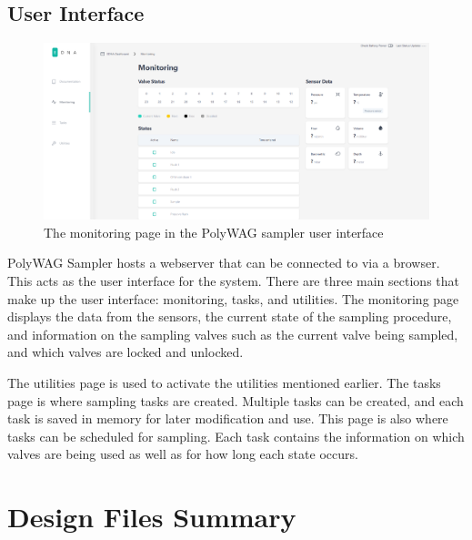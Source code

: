 \documentclass[11pt, letterpaper]{article}
\begin{document}
\subsection{User Interface}
\label{subsec:UI}
\begin{figure}[H]
	\centering
	\includegraphics[scale=0.35]{./Assets/UI.png}
	\caption{The monitoring page in the PolyWAG sampler user interface}
\end{figure}

PolyWAG Sampler hosts a webserver that can be connected to via a browser. This acts as the user interface for the system. There are three main sections that make up the user interface: monitoring, tasks, and utilities. The monitoring page displays the data from the sensors, the current state of the sampling procedure, and information on the sampling valves such as the current valve being sampled, and which valves are locked and unlocked. 
\newline\par\noindent

The utilities page is used to activate the utilities mentioned earlier. The tasks page is where sampling tasks are created. Multiple tasks can be created, and each task is saved in memory for later modification and use. This page is also where tasks can be scheduled for sampling. Each task contains the information on which valves are being used as well as for how long each state occurs. 


\section{Design Files Summary}
%
%
\end{document}
